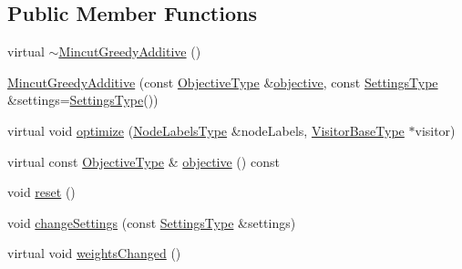 \subsection*{Public Member Functions}
\begin{DoxyCompactItemize}
\item 
virtual \hyperlink{classnifty_1_1graph_1_1opt_1_1mincut_1_1MincutGreedyAdditive_aa1f9747e0319c0614c9d0e04586d8e46}{$\sim$\+Mincut\+Greedy\+Additive} ()
\item 
\hyperlink{classnifty_1_1graph_1_1opt_1_1mincut_1_1MincutGreedyAdditive_a65fff86234d1c749a4355557a80b40a4}{Mincut\+Greedy\+Additive} (const \hyperlink{classnifty_1_1graph_1_1opt_1_1mincut_1_1MincutGreedyAdditive_a1e4f0fc6675ac7d977619126bfd6e143}{Objective\+Type} \&\hyperlink{classnifty_1_1graph_1_1opt_1_1mincut_1_1MincutGreedyAdditive_adddbe72afb04c110796dbcc753dd603a}{objective}, const \hyperlink{classnifty_1_1graph_1_1opt_1_1mincut_1_1MincutGreedyAdditive_acc6768ee2aa88a457488451751bd4aac}{Settings\+Type} \&settings=\hyperlink{classnifty_1_1graph_1_1opt_1_1mincut_1_1MincutGreedyAdditive_acc6768ee2aa88a457488451751bd4aac}{Settings\+Type}())
\item 
virtual void \hyperlink{classnifty_1_1graph_1_1opt_1_1mincut_1_1MincutGreedyAdditive_a37d99b0e539ca6150d7ba6a713d937c5}{optimize} (\hyperlink{classnifty_1_1graph_1_1opt_1_1mincut_1_1MincutGreedyAdditive_a5a8855589a1e752e63650d8e678fc162}{Node\+Labels\+Type} \&node\+Labels, \hyperlink{classnifty_1_1graph_1_1opt_1_1mincut_1_1MincutGreedyAdditive_a6754295908ae1d3f3ce8a98999bff99d}{Visitor\+Base\+Type} $\ast$visitor)
\item 
virtual const \hyperlink{classnifty_1_1graph_1_1opt_1_1mincut_1_1MincutGreedyAdditive_a1e4f0fc6675ac7d977619126bfd6e143}{Objective\+Type} \& \hyperlink{classnifty_1_1graph_1_1opt_1_1mincut_1_1MincutGreedyAdditive_adddbe72afb04c110796dbcc753dd603a}{objective} () const
\item 
void \hyperlink{classnifty_1_1graph_1_1opt_1_1mincut_1_1MincutGreedyAdditive_ad22ac997a0041491747fe5e13b500fed}{reset} ()
\item 
void \hyperlink{classnifty_1_1graph_1_1opt_1_1mincut_1_1MincutGreedyAdditive_ae518386c1ce114c22caf499a4ff1cf4a}{change\+Settings} (const \hyperlink{classnifty_1_1graph_1_1opt_1_1mincut_1_1MincutGreedyAdditive_acc6768ee2aa88a457488451751bd4aac}{Settings\+Type} \&settings)
\item 
virtual void \hyperlink{classnifty_1_1graph_1_1opt_1_1mincut_1_1MincutGreedyAdditive_aa7b71928fc3f6e46f5ec99c0119c5787}{weights\+Changed} ()

\end{DoxyCompactItemize}
